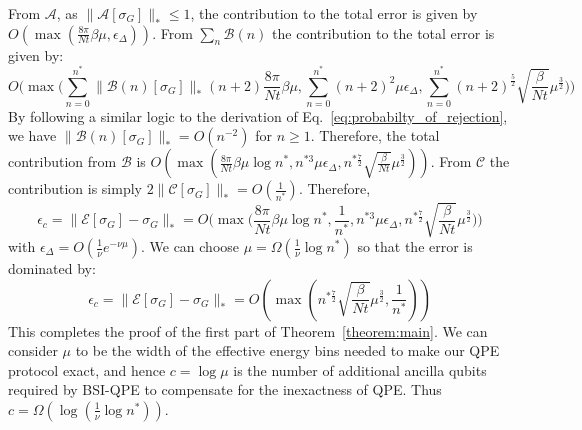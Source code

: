 From $\mathcal{A}$, as $\|\mathcal{A}[\sigma_G]\|_* \leq 1$, the contribution to the total error is given by $O(\max(\frac{8\pi}{Nt}\beta\mu,\epsilon_{\Delta}))$. From $\sum_n\mathcal{B}(n)$ the contribution to the total error is given by:
\begin{equation}
    O\!\bigg(\max\!\bigg(\sum_{n=0}^{n^*}\|\mathcal B(n)[\sigma_G]\|_* (n+2)\frac{8\pi}{Nt}\beta \mu,
    \sum_{n=0}^{n^*}(n+2)^2\mu\epsilon_{\Delta}, \sum_{n=0}^{n^*}(n+2)^{\frac{5}{2}}\sqrt{\frac{\beta }{Nt}}\mu^{\frac{3}{2}}\bigg)\bigg)
\end{equation}
By following a similar logic to the derivation of Eq.~\eqref{eq:probabilty_of_rejection}, we have $\|\mathcal B(n)[\sigma_G]\|_* = O(n^{-2})$ for $n\geq1$. Therefore, the total contribution from $\mathcal{B}$ is $O(\!\max(\frac{8\pi}{Nt}\beta \mu \log n^*,n^{*3}\mu\epsilon_{\Delta},n^{*\frac{7}{2}}\sqrt{\frac{\beta }{Nt}}\mu^{\frac{3}{2}}))$. From $\mathcal{C}$ the contribution is simply $2\|\mathcal{C}[\sigma_G]\|_* = O(\frac{1}{n^*})$. Therefore,
 \begin{equation}
   \epsilon_c = \|\mathcal{E}[\sigma_G] - \sigma_G\|_* = O\bigg(\max\bigg( \frac{8\pi}{Nt}\beta\mu \log n^* ,\frac{1}{n^*}, n^{*3}\mu\epsilon_{\Delta},n^{*\frac{7}{2}}\sqrt{\frac{\beta }{Nt}}\mu^{\frac{3}{2}}\bigg)\bigg)
   \label{eq:combinedtotalerror}
\end{equation}
with $\epsilon_{\Delta}=O(\frac{1}{\nu}e^{-\nu\mu})$. We can choose $\mu = \Omega(\frac{1}{\nu}\log n^*)$ so that the error is dominated by:
 \begin{equation}
   \epsilon_c = \|\mathcal{E}[\sigma_G] - \sigma_G\|_* = O\left(\max\left( n^{*\frac{7}{2}}\sqrt{\frac{\beta }{Nt}}\mu^{\frac{3}{2}} ,\frac{1}{n^*}\right)\right)
    \label{eq:error_bound}
\end{equation}
This completes the proof of the first part of Theorem~\ref{theorem:main}. We can consider $\mu$ to be the width of the effective energy bins needed to make our QPE protocol exact, and hence $c=\log\mu$ is the number of additional ancilla qubits required by BSI-QPE to compensate for the inexactness of QPE. Thus $c=\Omega(\log(\frac{1}{\nu}\log n^*))$.

